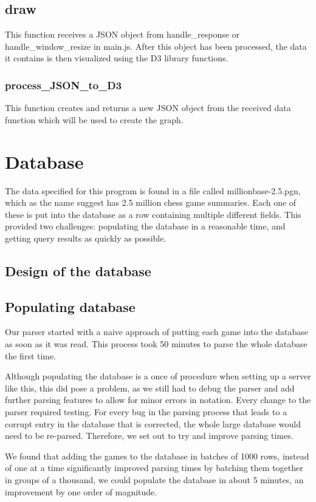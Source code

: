 \documentclass{article}
\begin{document}
\subsection*{draw}
This function receives a JSON object from handle\_response or handle\_window\_resize in main.js. After this object has been processed, the data it contains is then visualized using the D3 library functions.

\subsubsection*{process\_JSON\_to\_D3}
This function creates and returns a new JSON object from the received data function which will be used to create the graph.

\section{Database}
The data specified for this program is found in a file called
millionbase-2.5.pgn, which as the name suggest has 2.5 million chess game
summaries. Each one of these is put into the database as a row containing
multiple different fields.  This provided two challenges:  populating the
database in a reasonable time, and getting query results as quickly as
possible.

\subsection{Design of the database}

\subsection{Populating database}
Our parser started with a naive approach of putting each game into the
database as soon as it was read.  This process took 50 minutes to parse the
whole database the first time.

Although populating the database is a once
of procedure when setting up a server like this, this did pose a problem,
as we still had to debug the parser and add further parsing features to
allow for minor errors in notation. Every change to the parser required
testing.  For every bug in the parsing process that leads to a corrupt
entry in the database that is corrected, the whole large database would
need to be re-parsed.  Therefore, we set out to try and improve parsing
times.

We found that adding the games to the database in batches of 1000 rows, instead
of one at a time significantly improved parsing times by batching them
together in groups of a thousand, we could populate the database in about 5
minutes, an improvement by one order of magnitude.
\end{document}
